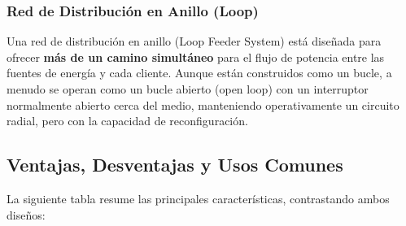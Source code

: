 \subsubsection{Red de Distribución en Anillo (Loop)}
Una red de distribución en anillo (Loop Feeder System) está diseñada para ofrecer \textbf{más de un camino simultáneo} para el flujo de potencia entre las fuentes de energía y cada cliente. Aunque están construidos como un bucle, a menudo se operan como un bucle abierto (open loop) con un interruptor normalmente abierto cerca del medio, manteniendo operativamente un circuito radial, pero con la capacidad de reconfiguración.

\subsection{Ventajas, Desventajas y Usos Comunes}

La siguiente tabla resume las principales características, contrastando ambos diseños:



